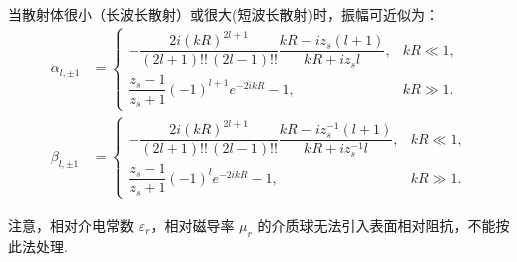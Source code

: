 \begin{exbox}
	当散射体很小（长波长散射）或很大(短波长散射)时，振幅可近似为：
	\begin{align*}
		\alpha_{l,\pm1}&=
		\begin{cases}
			-\dfrac{2i(kR)^{2l+1}}{(2l+1)!!\,(2l-1)!!}\dfrac{kR-i z_s(l+1)}{kR+i z_s l}, & kR\ll1, \\
			\dfrac{z_s-1}{z_s+1}(-1)^{l+1}e^{-2ikR}-1,                                   & kR\gg1.
		\end{cases}\\
		\beta_{l,\pm1}&=
		\begin{cases}
			-\dfrac{2i(kR)^{2l+1}}{(2l+1)!!\,(2l-1)!!}\dfrac{kR-i z_s^{-1}(l+1)}{kR+i z_s^{-1}l}, & kR\ll1, \\
			\dfrac{z_s-1}{z_s+1}(-1)^l e^{-2ikR}-1,                                               & kR\gg1.
		\end{cases}
	\end{align*}

	注意，相对介电常数 \(\varepsilon_r\)，相对磁导率 \(\mu_r\) 的介质球无法引入表面相对阻抗，不能按此法处理.
\end{exbox}

